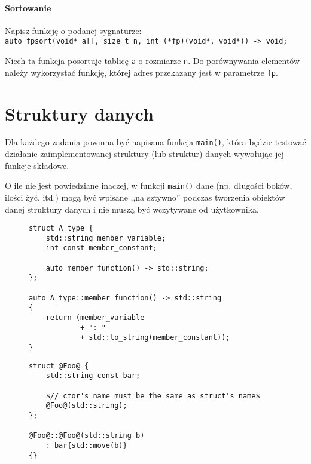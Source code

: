 \documentclass[11pt,a4paper,titlepage,onecolumn]{article}
\begin{document}
\paragraph{Sortowanie} Napisz funkcję o podanej sygnaturze:\\
\texttt{auto fpsort(void* a[], size\_t n, int (*fp)(void*, void*)) -> void;}

Niech ta funkcja posortuje tablicę \texttt{a} o rozmiarze \texttt{n}. Do
porównywania elementów należy wykorzystać funkcję, której adres przekazany jest
w parametrze \texttt{fp}.

\newpage
\section{Struktury danych}

Dla każdego zadania powinna być napisana funkcja \texttt{main()}, która będzie
testować działanie zaimplementowanej struktury (lub struktur) danych wywołując
jej funkcje składowe.

O ile nie jest powiedziane inaczej, w funkcji \texttt{main()} dane (np. długości
boków, ilości żyć, itd.) mogą być wpisane ,,na sztywno'' podczas tworzenia
obiektów danej struktury danych i nie muszą być wczytywane od użytkownika.

\begin{figure}[!htp]
{\small
\begin{lstlisting}[caption={struct},
    captionpos=b,
    label=listing_0010_struct]
struct A_type {
    std::string member_variable;
    int const member_constant;

    auto member_function() -> std::string;
};

auto A_type::member_function() -> std::string
{
    return (member_variable
            + ": "
            + std::to_string(member_constant));
}
\end{lstlisting}}
\end{figure}

\begin{figure}[!htp]
{\small
\begin{lstlisting}[caption={konstruktor},
    captionpos=b,
    label=listing_0011_ctor]
struct @Foo@ {
    std::string const bar;

    $// ctor's name must be the same as struct's name$
    @Foo@(std::string);
};

@Foo@::@Foo@(std::string b)
    : bar{std::move(b)}
{}
\end{lstlisting}}
\end{figure}
\end{document}
